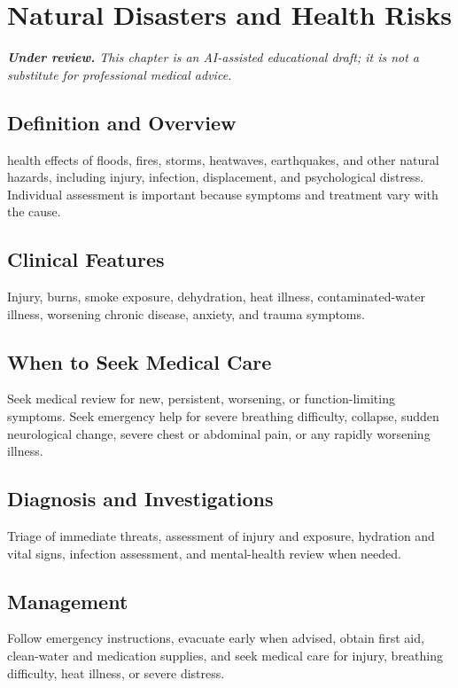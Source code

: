 \chapter{Natural Disasters and Health Risks}

\medskip
\noindent\textit{\textbf{Under review.} This chapter is an AI-assisted educational draft; it is not a substitute for professional medical advice.}

\section*{Definition and Overview}
health effects of floods, fires, storms, heatwaves, earthquakes, and other natural hazards, including injury, infection, displacement, and psychological distress. Individual assessment is important because symptoms and treatment vary with the cause.

\section*{Clinical Features}
Injury, burns, smoke exposure, dehydration, heat illness, contaminated-water illness, worsening chronic disease, anxiety, and trauma symptoms.

\section*{When to Seek Medical Care}
Seek medical review for new, persistent, worsening, or function-limiting symptoms. Seek emergency help for severe breathing difficulty, collapse, sudden neurological change, severe chest or abdominal pain, or any rapidly worsening illness.

\section*{Diagnosis and Investigations}
Triage of immediate threats, assessment of injury and exposure, hydration and vital signs, infection assessment, and mental-health review when needed.

\section*{Management}
Follow emergency instructions, evacuate early when advised, obtain first aid, clean-water and medication supplies, and seek medical care for injury, breathing difficulty, heat illness, or severe distress.

